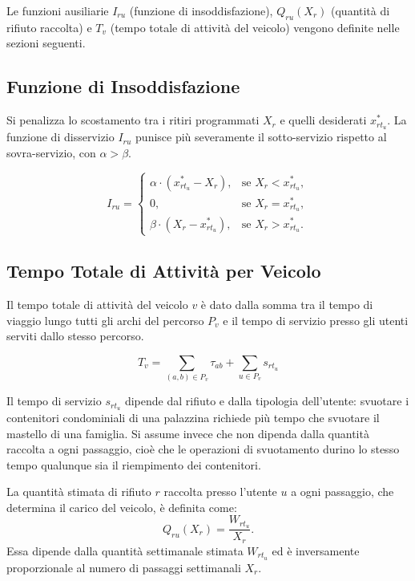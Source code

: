\noindent
Le funzioni ausiliarie $I_{ru}$ (funzione di insoddisfazione), $Q_{ru}(X_r)$ (quantità di rifiuto raccolta) e $T_v$ (tempo totale di attività del veicolo) vengono definite nelle sezioni seguenti.

\subsection{Funzione di Insoddisfazione}

Si penalizza lo scostamento tra i ritiri programmati $X_r$ e quelli desiderati $x^*_{r t_u}$. La funzione di disservizio $I_{ru}$ punisce più severamente il sotto-servizio rispetto al sovra-servizio, con $\alpha > \beta$.

\begin{equation}
	I_{ru} =
	\begin{cases}
		\alpha \cdot \left(x^*_{r t_u} - X_r\right), & \text{se } X_r < x^*_{r t_u}, \\
		0, & \text{se } X_r = x^*_{r t_u}, \\
		\beta \cdot \left(X_r - x^*_{r t_u}\right), & \text{se } X_r > x^*_{r t_u}.
	\end{cases}
\end{equation}


\subsection{Tempo Totale di Attività per Veicolo}

Il tempo totale di attività del veicolo $v$ è dato dalla somma tra il tempo di viaggio lungo tutti gli archi del percorso $P_v$ e il tempo di servizio presso gli utenti serviti dallo stesso percorso.

\begin{equation}
	T_v = \sum_{(a,b) \in P_v} \tau_{ab}
	+ \sum_{u \in P_v} s_{r t_u}
\end{equation}

\noindent
Il tempo di servizio $s_{r t_u}$ dipende dal rifiuto e dalla tipologia dell'utente: svuotare i contenitori condominiali di una palazzina richiede più tempo che svuotare il mastello di una famiglia. Si assume invece che non dipenda dalla quantità raccolta a ogni passaggio, cioè che le operazioni di svuotamento durino lo stesso tempo qualunque sia il riempimento dei contenitori.

La quantità stimata di rifiuto $r$ raccolta presso l'utente $u$ a ogni passaggio, che determina il carico del veicolo, è definita come:
\begin{equation}
	Q_{ru}(X_r) = \frac{W_{r t_u}}{X_r}.
\end{equation}
Essa dipende dalla quantità settimanale stimata $W_{r t_u}$ ed è inversamente proporzionale al numero di passaggi settimanali $X_r$.

